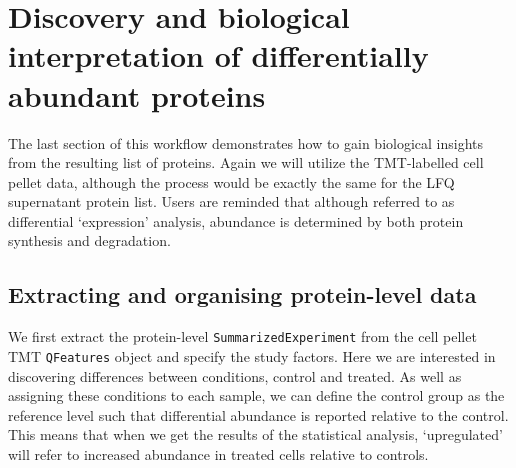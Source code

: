 \documentclass[9pt,a4paper,]{extarticle}
\newenvironment{Shaded}{\begin{snugshade}}{\end{snugshade}}
\newcommand{\DocumentationTok}[1]{\textcolor[rgb]{0.56,0.35,0.01}{\textbf{\textit{#1}}}}
\newcommand{\FunctionTok}[1]{\textcolor[rgb]{0.13,0.29,0.53}{\textbf{#1}}}
\newcommand{\NormalTok}[1]{#1}
\newcommand{\OtherTok}[1]{\textcolor[rgb]{0.56,0.35,0.01}{#1}}
\newcommand{\SpecialCharTok}[1]{\textcolor[rgb]{0.81,0.36,0.00}{\textbf{#1}}}
\newcommand{\StringTok}[1]{\textcolor[rgb]{0.31,0.60,0.02}{#1}}
\begin{document}
\section{Discovery and biological interpretation of differentially abundant proteins}\label{discovery-and-biological-interpretation-of-differentially-abundant-proteins}

The last section of this workflow demonstrates how to gain biological insights
from the resulting list of proteins. Again we will utilize the TMT-labelled cell
pellet data, although the process would be exactly the same for the LFQ
supernatant protein list. Users are reminded that although referred to as
differential `expression' analysis, abundance is determined by both protein
synthesis and degradation.

\subsection{Extracting and organising protein-level data}\label{extracting-and-organising-protein-level-data}

We first extract the protein-level \texttt{SummarizedExperiment} from the cell pellet
TMT \texttt{QFeatures} object and specify the study factors. Here we are interested in
discovering differences between conditions, control and treated. As well as
assigning these conditions to each sample, we can define the control group as the
reference level such that differential abundance is reported relative to the
control. This means that when we get the results of the statistical analysis,
`upregulated' will refer to increased abundance in treated cells relative to
controls.

\begin{Shaded}
\end{Shaded}
\end{document}
